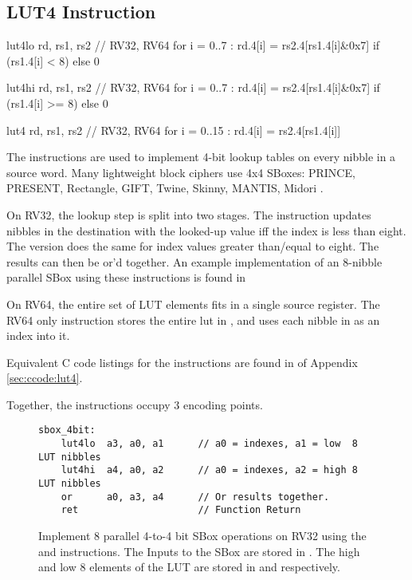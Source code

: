 

\subsection{LUT4 Instruction}

\begin{cryptoisa}
lut4lo  rd, rs1, rs2    // RV32, RV64
    for i = 0..7 : rd.4[i] = rs2.4[rs1.4[i]&0x7] if (rs1.4[i] <  8) else 0

lut4hi  rd, rs1, rs2    // RV32, RV64
    for i = 0..7 : rd.4[i] = rs2.4[rs1.4[i]&0x7] if (rs1.4[i] >= 8) else 0

lut4    rd, rs1, rs2    // RV32, RV64
    for i = 0..15 : rd.4[i] = rs2.4[rs1.4[i]]
\end{cryptoisa}

The  instructions are used to implement 4-bit lookup tables
on every nibble in a source word.
Many lightweight block ciphers use 4x4 SBoxes:
PRINCE\cite{block:prince},
PRESENT\cite{block:present},
Rectangle\cite{block:rectangle},
GIFT\cite{block:gift},
Twine\cite{block:twine},
Skinny, MANTIS\cite{block:skinny},
Midori \cite{block:midori}.

On RV32, the lookup step is split into two stages.
The  instruction
updates nibbles in the destination with the looked-up value
iff the index is less than eight.
The  version does
the same for index values greater than/equal to eight.
The results can then be or'd together.
An example implementation of an $8$-nibble parallel SBox using these
instructions is found in 

On RV64, the entire set of LUT elements fits in a single source register.
The RV64 only  instruction stores the entire lut in
\rstwo, and uses each nibble in \rsone as an index into it.

Equivalent C code listings for the instructions are found in
 of Appendix \ref{sec:ccode:lut4}.

Together, the instructions occupy $3$ encoding points.

\begin{figure}[h]
\begin{lstlisting}[style=ASM]
sbox_4bit:
    lut4lo  a3, a0, a1      // a0 = indexes, a1 = low  8 LUT nibbles
    lut4hi  a4, a0, a2      // a0 = indexes, a2 = high 8 LUT nibbles
    or      a0, a3, a4      // Or results together.
    ret                     // Function Return
\end{lstlisting}
\caption{
    Implement 8 parallel 4-to-4 bit SBox operations on RV32 using
    the  and  instructions.
    The Inputs to the SBox are stored in .
    The high and low $8$ elements of the
    LUT are stored in  and  respectively.
}
\label{fig:example:lut4:1}
\end{figure}

